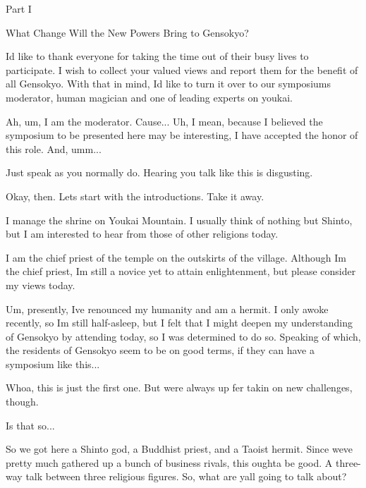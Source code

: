 \begin{tcolorbox}[breakable, colback=white, colframe=black!80,
  boxrule=0.6pt, arc=0mm, left=3mm, right=3mm, top=2mm, bottom=2mm]
\ttfamily\small\raggedright
Part I\par
What Change Will the New Powers Bring to Gensokyo?\par
\medskip
I\textquotesingle{}d like to thank everyone for taking the time out of their busy lives to participate. I wish to collect your valued views and report them for the benefit of all Gensokyo. With that in mind, I\textquotesingle{}d like to turn it over to our symposium\textquotesingle{}s moderator, human magician and one of leading experts on youkai.\par
\medskip
Ah, um, I am the moderator. \textquotesingle{}Cause... Uh, I mean, because I believed the symposium to be presented here may be interesting, I have accepted the honor of this role. And, umm...\par
\medskip
Just speak as you normally do. Hearing you talk like this is disgusting.\par
\medskip
Okay, then. Let\textquotesingle{}s start with the introductions. Take it away.\par
\medskip
I manage the shrine on Youkai Mountain. I usually think of nothing but Shinto, but I am interested to hear from those of other religions today.\par
\medskip
I am the chief priest of the temple on the outskirts of the village. Although I\textquotesingle{}m the chief priest, I\textquotesingle{}m still a novice yet to attain enlightenment, but please consider my views today.\par
\medskip
Um, presently, I\textquotesingle{}ve renounced my humanity and am a hermit. I only awoke recently, so I\textquotesingle{}m still half-{}asleep, but I felt that I might deepen my understanding of Gensokyo by attending today, so I was determined to do so. Speaking of which, the residents of Gensokyo seem to be on good terms, if they can have a symposium like this...\par
\medskip
Whoa, this is just the first one. But we\textquotesingle{}re always up fer takin\textquotesingle{} on new challenges, though.\par
\medskip
Is that so...\par
{}\par
\medskip
So we got here a Shinto god, a Buddhist priest, and a Taoist hermit. Since we\textquotesingle{}ve pretty much gathered up a bunch of business rivals, this oughta be good. A three-{}way talk between three religious figures. So, what are y\textquotesingle{}all going to talk about?\par

\end{tcolorbox}
